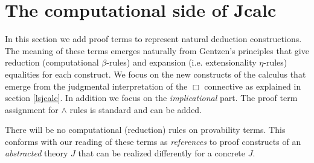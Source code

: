 \chapter{The computational side of Jcalc }
\label{jcalccom}
In this section we add proof terms to represent natural deduction constructions. 
The  meaning of these terms emerges naturally from Gentzen's principles that give reduction 
(computational $\beta$-rules) and expansion (i.e. extensionality $\eta$-rules) equalities for 
 each construct. We focus on the new constructs of the calculus that emerge from the judgmental interpretation of the $\Box$ connective as explained in 
section \ref{lsjcalc}. In addition we focus on the \textit{implicational} part. The proof term assignment
for $\wedge$ rules is standard and can be added.

There will be no computational (reduction) rules on  provability terms. 
This conforms with our reading of these terms  as \textit{references} to proof constructs of an \textit{abstracted} theory $J$ that can be realized 
differently for a concrete $J$.  

